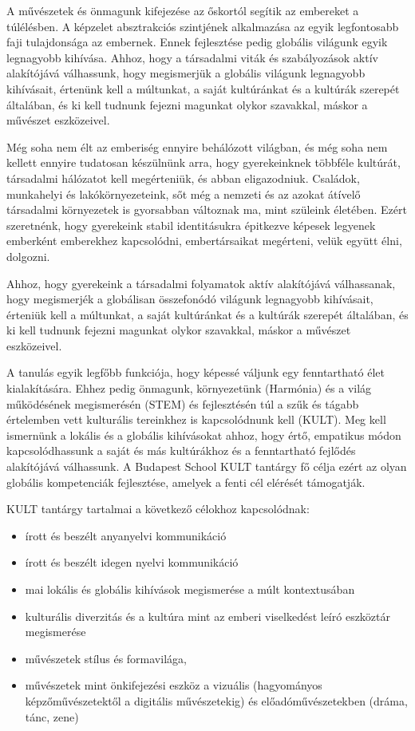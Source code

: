 A művészetek és önmagunk kifejezése az őskortól segítik az embereket a túlélésben. A képzelet absztrakciós szintjének alkalmazása az egyik legfontosabb faji tulajdonsága az embernek. Ennek fejlesztése pedig globális világunk egyik legnagyobb kihívása. Ahhoz, hogy a társadalmi viták és szabályozások aktív alakítójává válhassunk, hogy megismerjük a globális világunk legnagyobb kihívásait, értenünk kell a múltunkat, a saját kultúránkat és a kultúrák szerepét általában, és ki kell tudnunk fejezni magunkat olykor szavakkal, máskor a művészet eszközeivel.

Még soha nem élt az emberiség ennyire behálózott világban, és még soha nem kellett ennyire tudatosan készülnünk arra, hogy gyerekeinknek többféle kultúrát, társadalmi hálózatot kell megérteniük, és abban eligazodniuk. Családok, munkahelyi és lakókörnyezeteink, sőt még a nemzeti és az azokat átívelő társadalmi környezetek is gyorsabban változnak ma, mint szüleink életében. Ezért szeretnénk, hogy gyerekeink stabil identitásukra épitkezve képesek legyenek emberként emberekhez kapcsolódni, embertársaikat megérteni, velük együtt élni, dolgozni.

Ahhoz, hogy gyerekeink a társadalmi folyamatok aktív alakítójává válhassanak, hogy megismerjék a globálisan összefonódó világunk legnagyobb kihívásait, érteniük kell a múltunkat, a saját kultúránkat és a kultúrák szerepét általában, és ki kell tudnunk fejezni magunkat olykor szavakkal, máskor a művészet eszközeivel.

A tanulás egyik legfőbb funkciója, hogy képessé váljunk egy fenntartható élet kialakítására. Ehhez pedig önmagunk, környezetünk (Harmónia) és a világ működésének megismerésén (STEM) és fejlesztésén túl a szűk és tágabb értelemben vett kulturális tereinkhez is kapcsolódnunk kell (KULT). Meg kell ismernünk a lokális és a globális kihívásokat ahhoz, hogy értő, empatikus módon kapcsolódhassunk a saját és más kultúrákhoz és a fenntartható fejlődés alakítójává válhassunk. A Budapest School KULT tantárgy fő célja ezért az olyan globális kompetenciák fejlesztése, amelyek a fenti cél elérését támogatják.

KULT tantárgy tartalmai a következő célokhoz kapcsolódnak:
\begin{itemize}
\item írott és beszélt anyanyelvi kommunikáció

\item írott és beszélt idegen nyelvi kommunikáció

\item mai lokális és globális kihívások megismerése a múlt kontextusában

\item kulturális diverzitás és a kultúra mint az emberi viselkedést leíró eszköztár megismerése

\item művészetek stílus és formavilága,

\item művészetek mint önkifejezési eszköz a vizuális (hagyományos képzőművészetektől a digitális művészetekig) és előadóművészetekben (dráma, tánc, zene)
\end{itemize}

